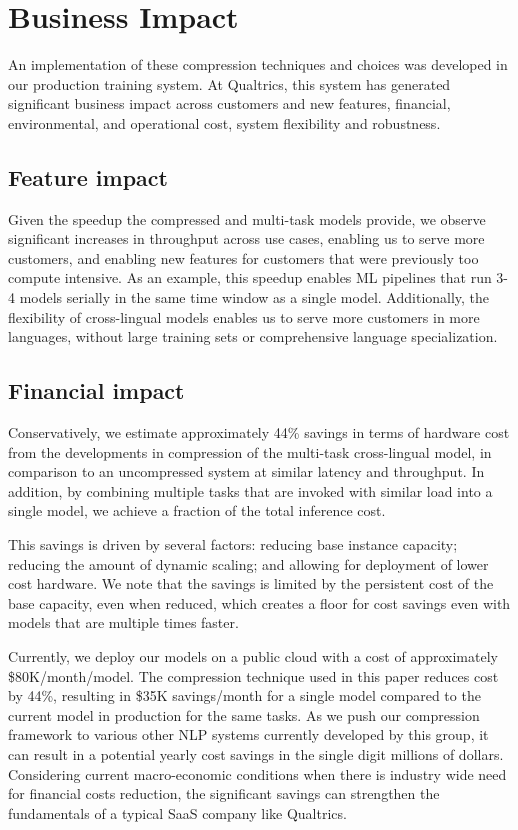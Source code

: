 \section{Business Impact}
An implementation of these compression techniques and choices was developed in our production training system.
At Qualtrics, this system has generated significant business impact across customers and new features, financial, environmental, and operational cost, system flexibility and robustness.

\subsection{Feature impact}
Given the speedup the compressed and multi-task models provide, we observe significant increases in throughput across use cases, enabling us to serve more customers, and enabling new features for customers that were previously too compute intensive.
As an example, this speedup enables ML pipelines that run 3-4 models serially in the same time window as a single model.
Additionally, the flexibility of cross-lingual models enables us to serve more customers in more languages, without large training sets or comprehensive language specialization.

\subsection{Financial impact}
Conservatively, we estimate approximately 44\% savings in terms of hardware cost from the developments in compression of the multi-task cross-lingual model, in comparison to an uncompressed system at similar latency and throughput.
In addition, by combining multiple tasks that are invoked with similar load into a single model, we achieve a fraction of the total inference cost.

This savings is driven by several factors: reducing base instance capacity; reducing the amount of dynamic scaling; and allowing for deployment of lower cost hardware.
We note that the savings is limited by the persistent cost of the base capacity, even when reduced, which creates a floor for cost savings even with models that are multiple times faster.

Currently, we deploy our models on a public cloud with a cost of approximately \$80K/month/model.
The compression technique used in this paper reduces cost by 44\%, resulting in \$35K savings/month for a single model compared to the current model in production for the same tasks.
As we push our compression framework to various other NLP systems currently developed by this group, it can result in a potential yearly cost savings in the single digit millions of dollars.
Considering current macro-economic conditions when there is industry wide need for financial costs reduction, the significant savings can strengthen the fundamentals of a typical SaaS company like Qualtrics. 

